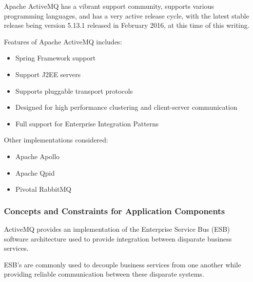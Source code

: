 Apache ActiveMQ has a vibrant support community, supports various programming
languages, and has a very active release cycle, with the latest stable release
being version 5.13.1 released in February 2016, at this time of this writing.

Features of Apache ActiveMQ includes:
\begin{itemize}
	\item Spring Framework support
	\item Support J2EE servers
	\item Supports pluggable transport protocols
	\item Designed for high performance clustering and client-server communication
	\item Full support for Enterprise Integration Patterns
\end{itemize}

Other implementations considered:
\begin{itemize}
	\item Apache Apollo
	\item Apache Qpid
	\item Pivotal RabbitMQ
\end{itemize}

\subsubsection{Concepts and Constraints for Application Components}
ActiveMQ provides an implementation of the  Enterprise Service Bus (ESB) software
architecture used to provide integration between disparate business services.

ESB's are commonly used to decouple business services from one another while
providing reliable communication between these disparate systems. 